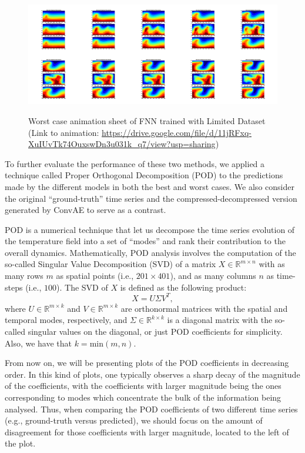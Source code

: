 \begin{figure}[H]
    \centering
    \caption{Worst case animation sheet of FNN trained with Limited Dataset (Link to animation: 
    \url{https://drive.google.com/file/d/11jRFxq-XuIUvTk74OuxswDn3u031k_q7/view?usp=sharing})}
    \includegraphics[scale=0.10]{figures/mantle_convection_images/limited_dataset/FNN_Worst_GIF_sheet.png}
    \label{figure:FNN_limited_worst_gif}
\end{figure}

To further evaluate the performance of these two methods, we applied a technique called Proper Orthogonal Decomposition (POD) to the predictions made by the different models in both the best and worst cases. We also consider the original ``ground-truth'' time series and the compressed-decompressed version generated by ConvAE to serve as a contrast.

POD is a numerical technique that let us decompose the time series evolution of the temperature field into a set of ``modes'' and rank their contribution to the overall dynamics. \citep{10.1515_9783110671490-007} Mathematically, POD analysis involves the computation of the so-called Singular Value Decomposition (SVD) of a matrix $X \in \mathbb{R}^{m \times n}$ with as many rows $m$ as spatial points (i.e., $201 \times 401$), and as many columns $n$ as time-steps (i.e., $100$). The SVD of $X$ is defined as the following product:
\begin{equation}
X = U\Sigma V^{T},
\end{equation}
where $U \in \mathbb{R}^{m \times k}$ and $V \in \mathbb{R}^{m \times k}$ are orthonormal matrices with the spatial and temporal modes, respectively, and $\Sigma \in \mathbb{R}^{k \times k} $ is a diagonal matrix with the so-called singular values on the diagonal, or just POD coefficients for simplicity. Also, we have that $k=\mathrm{min}(m,n)$.

From now on, we will be presenting plots of the POD coefficients in decreasing order. In this kind of plots, one typically observes a sharp decay of the magnitude of the coefficients, with the coefficients with larger magnitude being the ones corresponding to modes which concentrate
the bulk of the information being analysed. Thus, when comparing the POD coefficients of two different time series (e.g., ground-truth versus predicted), we should focus on the amount of disagreement for those coefficients with larger magnitude, located to the left of the plot. 

